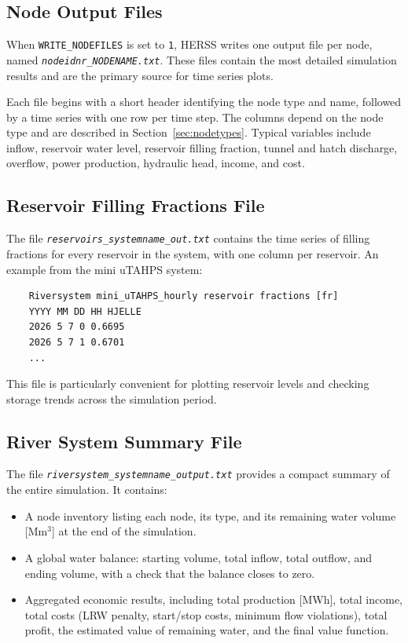 \documentclass[a4paper, 12pt]{report}
\newcommand{\file}[1]{\textit{\texttt{#1}}}  %
\begin{document}
	\subsection{Node Output Files}

	When \texttt{WRITE\_NODEFILES} is set to \texttt{1}, HERSS writes one output file per node,
	named \file{node\textit{idnr}\_\textit{NODENAME}.txt}. These files contain the most
	detailed simulation results and are the primary source for time series plots.

	Each file begins with a short header identifying the node type and name, followed by a
	time series with one row per time step. The columns depend on the node type and are
	described in Section~\ref{sec:nodetypes}. Typical variables include inflow,
	reservoir water level, reservoir filling fraction, tunnel and hatch discharge, overflow,
	power production, hydraulic head, income, and cost.

	\subsection{Reservoir Filling Fractions File}

	The file \file{reservoirs\_\textit{systemname}\_out.txt} contains the time series of
	filling fractions for every reservoir in the system, with one column per reservoir. An
	example from the mini uTAHPS system:

	\begin{verbatim}
	Riversystem mini_uTAHPS_hourly reservoir fractions [fr]
	YYYY MM DD HH HJELLE
	2026 5 7 0 0.6695
	2026 5 7 1 0.6701
	...
	\end{verbatim}

	This file is particularly convenient for plotting reservoir levels and checking storage
	trends across the simulation period.

	\subsection{River System Summary File}

	The file \file{riversystem\_\textit{systemname}\_output.txt} provides a compact summary of
	the entire simulation. It contains:

	\begin{itemize}
	\item A node inventory listing each node, its type, and its remaining water volume
	[Mm$^3$] at the end of the simulation.
	\item A global water balance: starting volume, total inflow, total outflow, and ending
	volume, with a check that the balance closes to zero.
	\item Aggregated economic results, including total production [MWh], total income,
	total costs (LRW penalty, start/stop costs, minimum flow violations), total profit,
	the estimated value of remaining water, and the final value function.
	\end{itemize}
\end{document}
